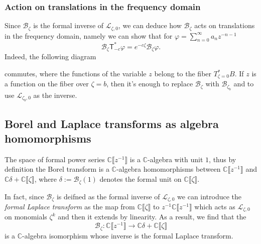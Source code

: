 \documentclass{article}
\newcommand{\C}{\mathbb{C}}
\newcommand{\laplace}{\mathcal{L}}
\newcommand{\borel}{\mathcal{B}}
\theoremstyle{definition}
\theoremstyle{plain}
\begin{document}
\subsubsection{Action on translations in the frequency domain}
Since $\borel_\zeta$ is the formal inverse of $\laplace_{\zeta,0}$, we can deduce how $\borel_\zeta$ acts on translations in the frequency domain, namely we can show that for $\varphi=\sum_{n=0}^\infty a_n z^{-n-1}$
\[\borel_\zeta \mathsf{T}_{-c}^* \varphi=e^{-c\zeta }\borel_\zeta\varphi.\]
Indeed, the following diagram
\begin{center}
\end{center}
commutes, where the functions of the variable $z$ belong to the fiber $T^*_{\zeta=0}B$. If $z$ is a function on the fiber over $\zeta=b$, then it's enough to replace $\borel_\zeta$ with $\borel_{\zeta_b}$ and to use  $\laplace_{\zeta_b,0}$ as the inverse. 
\subsection{Borel and Laplace transforms as algebra homomorphisms}\label{sec:borel-laplace-homom}
The space of formal power series $\C\llbracket z^{-1}\rrbracket$ is a $\C$-algebra with unit $1$, thus by definition the Borel transform is a $\C$-algebra homomorphisms between $\C\llbracket z^{-1}\rrbracket$ and $\C\delta +\C\llbracket\zeta\rrbracket$, where $\delta:=\borel_\zeta (1)$ denotes the formal unit on $\C\llbracket\zeta\rrbracket$. 

In fact, since $\borel_\zeta$ is deifned as the formal inverse of $\laplace_{\zeta,0}$ we can introduce the \textit{formal Laplace transform} as the map from $\C\llbracket \zeta\rrbracket$ to $z^{-1}\C\llbracket z^{-1}\rrbracket$ which acts as $\laplace_{\zeta,0}$ on monomials $\zeta^k$ and then it extends by linearity. As a result, we find that the \[\borel_\zeta\colon\C\llbracket z^{-1}\rrbracket\to\C\delta + \C\llbracket\zeta\rrbracket\] 
is a $\C$-algebra isomorphism whose inverse is the formal Laplace transform.
\end{document}
